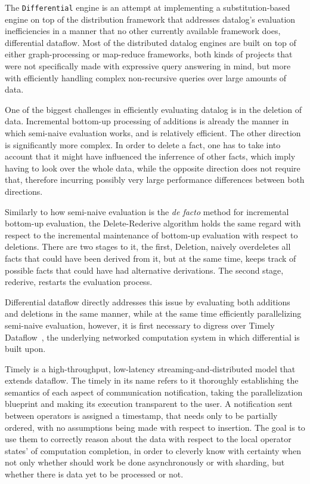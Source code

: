 \documentclass[sigconf,screen,review,natbib]{acmart}
\theoremstyle{definition}
\begin{document}
The \verb|Differential| engine is an attempt at implementing a substitution-based engine on top of the distribution framework that addresses datalog's
evaluation inefficiencies in a manner that no other currently available framework does, differential dataflow\cite{dd}. Most of the distributed datalog engines are
built on top of either graph-processing or map-reduce frameworks, both kinds of projects that were not specifically made with expressive query answering in mind, but
more with efficiently handling complex non-recursive queries over large amounts of data.

One of the biggest challenges in efficiently evaluating datalog is in the deletion of data. Incremental bottom-up processing of additions is already the
manner in which semi-naive evaluation works, and is relatively efficient. The other direction is significantly more complex. In order to delete a fact,
one has to take into account that it might have influenced the inferrence of other facts, which imply having to look over the whole data, while the opposite
direction does not require that, therefore incurring possibly very large performance differences between both directions.

Similarly to how semi-naive evaluation is the \textit{de facto} method for incremental bottom-up evaluation, the Delete-Rederive\cite{dred} algorithm holds
the same regard with respect to the incremental maintenance of bottom-up evaluation with respect to deletions. There are two stages to it, the first, Deletion,
naively overdeletes all facts that could have been derived from it, but at the same time, keeps track of possible facts that could have had alternative
derivations. The second stage, rederive, restarts the evaluation process.

Differential dataflow directly addresses this issue by evaluating both additions and deletions in the same manner, while at the same time efficiently parallelizing
semi-naive evaluation, however, it is first necessary to digress over Timely Dataflow~\cite{timely}, the underlying networked computation system in which differential
is built upon.

Timely is a high-throughput, low-latency streaming-and-distributed model that extends dataflow. The timely in its name refers to it thoroughly establishing
the semantics of each aspect of communication notification, taking the parallelization blueprint and making its execution transparent to the user. A notification
sent between operators is assigned a timestamp, that needs only to be partially ordered, with no assumptions being made with respect to insertion. The goal is to use
them to correctly reason about the data with respect to the local operator states' of computation completion, in order to cleverly know with certainty when not only
whether should work be done asynchronously or with sharding, but whether there is data yet to be processed or not.
\end{document}
